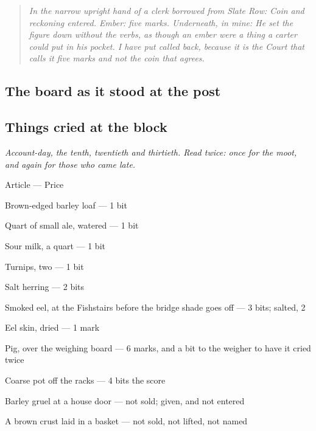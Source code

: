 \documentclass{design/chronicle}
\begin{document}
\begin{quote}\itshape \emph{In the narrow upright hand of a clerk borrowed from Slate Row:} Coin and reckoning entered. Ember: five marks. \emph{Underneath, in mine:} He set the figure down without the verbs, as though an ember were a thing a carter could put in his pocket. I have put \emph{called} back, because it is the Court that calls it five marks and not the coin that agrees.\end{quote}

\subsection*{The board as it stood at the post}

\subsection*{Things cried at the block}

\emph{Account-day, the tenth, twentieth and thirtieth. Read twice: once for the moot, and again for those who came late.}

Article — Price\par

Brown-edged barley loaf — 1 bit\par

Quart of small ale, watered — 1 bit\par

Sour milk, a quart — 1 bit\par

Turnips, two — 1 bit\par

Salt herring — 2 bits\par

Smoked eel, at the Fishstairs before the bridge shade goes off — 3 bits; salted, 2\par

Eel skin, dried — 1 mark\par

Pig, over the weighing board — 6 marks, and a bit to the weigher to have it cried twice\par

Coarse pot off the racks — 4 bits the score\par

Barley gruel at a house door — not sold; given, and not entered\par

A brown crust laid in a basket — not sold, not lifted, not named\par
\end{document}
